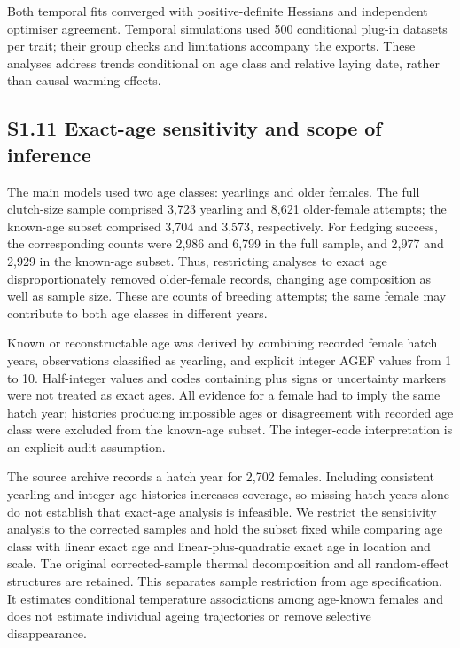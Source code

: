 \documentclass{article}
\begin{document}
Both temporal fits converged with positive-definite Hessians and independent optimiser agreement. Temporal simulations used 500 conditional plug-in datasets per trait; their group checks and limitations accompany the exports. These analyses address trends conditional on age class and relative laying date, rather than causal warming effects.

\subsection{S1.11 Exact-age sensitivity and scope of inference}

The main models used two age classes: yearlings and older females. The full clutch-size sample comprised 3,723 yearling and 8,621 older-female attempts; the known-age subset comprised 3,704 and 3,573, respectively. For fledging success, the corresponding counts were 2,986 and 6,799 in the full sample, and 2,977 and 2,929 in the known-age subset. Thus, restricting analyses to exact age disproportionately removed older-female records, changing age composition as well as sample size. These are counts of breeding attempts; the same female may contribute to both age classes in different years.


Known or reconstructable age was derived by combining recorded female hatch years, observations classified as yearling, and explicit integer AGEF values from 1 to 10. Half-integer values and codes containing plus signs or uncertainty markers were not treated as exact ages. All evidence for a female had to imply the same hatch year; histories producing impossible ages or disagreement with recorded age class were excluded from the known-age subset. The integer-code interpretation is an explicit audit assumption.

The source archive records a hatch year for 2,702 females. Including consistent yearling and integer-age histories increases coverage, so missing hatch years alone do not establish that exact-age analysis is infeasible. We restrict the sensitivity analysis to the corrected samples and hold the subset fixed while comparing age class with linear exact age and linear-plus-quadratic exact age in location and scale. The original corrected-sample thermal decomposition and all random-effect structures are retained. This separates sample restriction from age specification. It estimates conditional temperature associations among age-known females and does not estimate individual ageing trajectories or remove selective disappearance.
\end{document}
